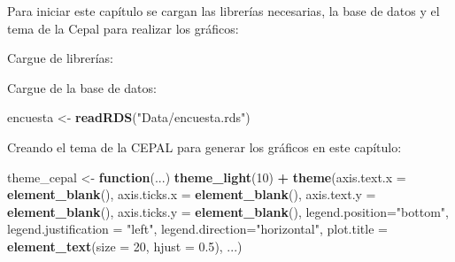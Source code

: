 \documentclass[
  12pt,
]{book}
\newenvironment{Shaded}{\begin{snugshade}}{\end{snugshade}}
\newcommand{\AttributeTok}[1]{\textcolor[rgb]{0.13,0.29,0.53}{#1}}
\newcommand{\ConstantTok}[1]{\textcolor[rgb]{0.56,0.35,0.01}{#1}}
\newcommand{\ControlFlowTok}[1]{\textcolor[rgb]{0.13,0.29,0.53}{\textbf{#1}}}
\newcommand{\DecValTok}[1]{\textcolor[rgb]{0.00,0.00,0.81}{#1}}
\newcommand{\FloatTok}[1]{\textcolor[rgb]{0.00,0.00,0.81}{#1}}
\newcommand{\FunctionTok}[1]{\textcolor[rgb]{0.13,0.29,0.53}{\textbf{#1}}}
\newcommand{\NormalTok}[1]{#1}
\newcommand{\OtherTok}[1]{\textcolor[rgb]{0.56,0.35,0.01}{#1}}
\newcommand{\SpecialCharTok}[1]{\textcolor[rgb]{0.81,0.36,0.00}{\textbf{#1}}}
\newcommand{\StringTok}[1]{\textcolor[rgb]{0.31,0.60,0.02}{#1}}
\begin{document}
Para iniciar este capítulo se cargan las librerías necesarias, la base de datos y el tema de la Cepal para realizar los gráficos:

Cargue de librerías:

\begin{Shaded}
\end{Shaded}

Cargue de la base de datos:

\begin{Shaded}
\begin{Highlighting}[]
\NormalTok{encuesta }\OtherTok{\textless{}{-}} \FunctionTok{readRDS}\NormalTok{(}\StringTok{"Data/encuesta.rds"}\NormalTok{) }
\end{Highlighting}
\end{Shaded}

Creando el tema de la CEPAL para generar los gráficos en este capítulo:

\begin{Shaded}
\begin{Highlighting}[]
\NormalTok{theme\_cepal }\OtherTok{\textless{}{-}} \ControlFlowTok{function}\NormalTok{(...) }\FunctionTok{theme\_light}\NormalTok{(}\DecValTok{10}\NormalTok{) }\SpecialCharTok{+} 
  \FunctionTok{theme}\NormalTok{(}\AttributeTok{axis.text.x =} \FunctionTok{element\_blank}\NormalTok{(),}
        \AttributeTok{axis.ticks.x =} \FunctionTok{element\_blank}\NormalTok{(),}
        \AttributeTok{axis.text.y =} \FunctionTok{element\_blank}\NormalTok{(),}
        \AttributeTok{axis.ticks.y =} \FunctionTok{element\_blank}\NormalTok{(),}
        \AttributeTok{legend.position=}\StringTok{"bottom"}\NormalTok{, }
        \AttributeTok{legend.justification =} \StringTok{"left"}\NormalTok{, }
        \AttributeTok{legend.direction=}\StringTok{"horizontal"}\NormalTok{,}
        \AttributeTok{plot.title =} \FunctionTok{element\_text}\NormalTok{(}\AttributeTok{size =} \DecValTok{20}\NormalTok{, }\AttributeTok{hjust =} \FloatTok{0.5}\NormalTok{),}
\NormalTok{        ...) }
\end{Highlighting}
\end{Shaded}
\end{document}
